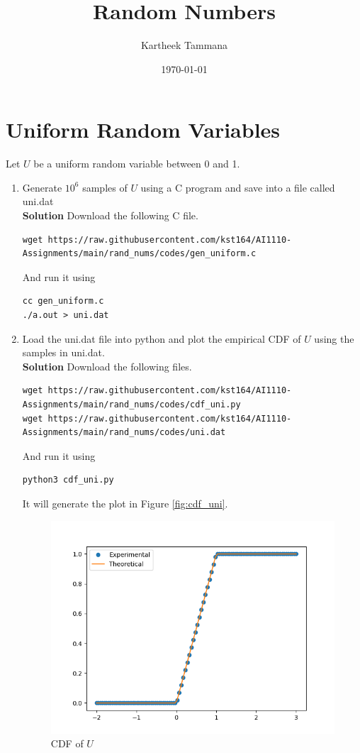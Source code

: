 \documentclass[journal, 12pt, twocolumn]{IEEEtran}
\title{Random Numbers}
\author{Kartheek Tammana}
\date{\today}
\begin{document}
\maketitle

\section{Uniform Random Variables}
Let $U$ be a uniform random variable between 0 and 1.
\begin{enumerate}[label=\arabic{section}.\arabic*]
    \item
        Generate $10^6$ samples of $U$ using a C program and save into a file called uni.dat
        \\
        \textbf{Solution} Download the following C file.
        \begin{lstlisting}
wget https://raw.githubusercontent.com/kst164/AI1110-Assignments/main/rand_nums/codes/gen_uniform.c
        \end{lstlisting}
        And run it using
        \begin{lstlisting}
cc gen_uniform.c
./a.out > uni.dat
        \end{lstlisting}

    \item
        Load the uni.dat file into python and plot the empirical CDF of $U$ using the samples in uni.dat.
        \\
        \textbf{Solution} Download the following files.
        \begin{lstlisting}
wget https://raw.githubusercontent.com/kst164/AI1110-Assignments/main/rand_nums/codes/cdf_uni.py
wget https://raw.githubusercontent.com/kst164/AI1110-Assignments/main/rand_nums/codes/uni.dat
        \end{lstlisting}
        And run it using
        \begin{lstlisting}
python3 cdf_uni.py
        \end{lstlisting}
        It will generate the plot in Figure \eqref{fig:cdf_uni}.
        \begin{figure}[!ht]
            \includegraphics[width=\columnwidth]{figs/cdf_uni.png}
            \caption{CDF of $U$}
            \label{fig:cdf_uni}
        \end{figure}


\end{enumerate}
\end{document}
